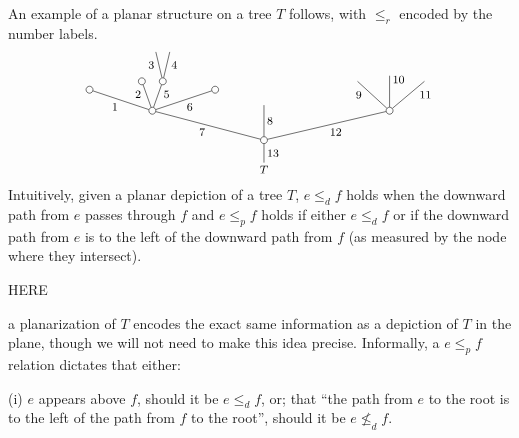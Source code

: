 \documentclass[a4paper,10pt]{article}%
\begin{document}
\begin{example}
An example of a planar structure on a tree $T$ follows, with $\leq_r$ encoded by the number labels.
\[
	\begin{tikzpicture}[grow=up,auto,level distance=2.1em,
	every node/.style = {font=\footnotesize,inner sep=2pt},
	dummy/.style={circle,draw,inner sep=0pt,minimum size=1.75mm}]
		\node at (0,0) {$T$}
			child{node [dummy] {}
				child[sibling distance = 9em]{node [dummy] {}
					child[sibling distance = 2.5em]{
					edge from parent node [near end,swap] {$11$}}
					child[level distance=2.5em]{
					edge from parent node [very near end,swap] {$10$}}				
					child[sibling distance = 2.3em]{
					edge from parent node [near end] {$9$}}
				edge from parent node [swap] {12}}
				child[level distance =2.5em]{
				edge from parent node [swap] {$8$}}
				child[sibling distance = 8em]{node [dummy] {}
					child[sibling distance =3em, level distance = 1.5 em]{node [dummy] {}
					edge from parent node [swap] {$6$}}
					child[sibling distance = 1.5em]{node [dummy] {}
						child[sibling distance =1em]{
						edge from parent node [swap,near end] {$4$}}
						child[sibling distance =1em]{
						edge from parent node [near end] {$3$}}
					edge from parent node [very near end,swap] {$5$}}
					child[sibling distance =1.5em]{node [dummy] {}
					edge from parent node [very near end] {$2$}}
					child[sibling distance =3em,level distance =1.5em]{node [dummy] {}
					edge from parent node {$1$}}
				edge from parent node {$7$}}
			edge from parent node [swap] {$13$}};
	\end{tikzpicture}
\]
Intuitively, given a planar depiction of a tree $T$, $e \leq_d f$ holds when the downward path from $e$ passes through $f$
and $e \leq_p f$ holds if either
$e \leq_d f$ or if the downward path from $e$ is to the left of the downward path from $f$ (as measured by the node where they intersect).


{\color{red} HERE}

a planarization of $T$ encodes the exact same information as a depiction of $T$ in the plane, though we will not  need to make this idea precise. Informally,
 a $e \leq_p f$ relation dictates that either: 
\begin{inparaenum}
	\item [(i)] $e$ appears above $f$, should it be $e \leq_d f$, or; that ``the path from $e$ to the root is to the left of the path from $f$ to the root'', should it be $e \nleq_d f$.
\end{inparaenum}
\end{example}
\end{document}
